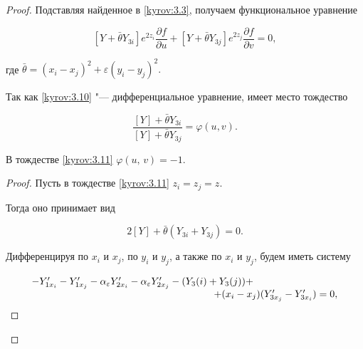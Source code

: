 \begin{proof}
Подставляя найденное в \eqref{kyrov:3.3}, получаем функциональное уравнение

\begin{equation}

\label{kyrov:3.10}

[Y+ \bar{\theta} Y_{3i}]e^{2z_i} \frac{\partial f}{\partial u} +[Y

+ \bar{\theta} Y_{3j}]e^{2z_j}\frac{\partial f}{\partial v} = 0,

\end{equation}

где $ \bar{\theta} = (x_i-x_j)^2 + \varepsilon(y_i-y_j)^2. $ 

Так как \eqref{kyrov:3.10} "--- дифференциальное уравнение, имеет место тождество

\begin{equation}

\label{kyrov:3.11}

\frac{[Y]+ \bar{\theta} Y_{3i}}{[Y]+ \bar{\theta} Y_{3j}} = \varphi(u,v).

\end{equation}





\begin{lemma}[3]В тождестве \eqref{kyrov:3.11} $\varphi(u,\,v) = -1.$

\end{lemma}



\begin{proof}

Пусть в тождестве \eqref{kyrov:3.11} $z_i = z_j = z$. 

Тогда оно принимает вид

$$

 2[Y] + \bar{\theta} (Y_{3i} + Y_{3j}) = 0.

$$

Дифференцируя по $x_i$ и $x_j$,  по $y_i$ и $y_j$, а также по $x_i$ и $y_j$, будем иметь систему

\begin{equation}

\label{kyrov:3.12}

\begin{array}{l}

-Y'_{1x_i} - Y'_{1x_j} - \alpha_{\varepsilon}Y'_{2x_i} - \alpha_{\varepsilon}Y'_{2x_j} - (Y_3(i) + Y_3(j)) + \\

\hspace{6.45cm} +(x_i - x_j)(Y'_{3x_j} - Y'_{3x_i}) = 0,


\end{array}
\end{equation}
\end{proof}
\end{proof}
